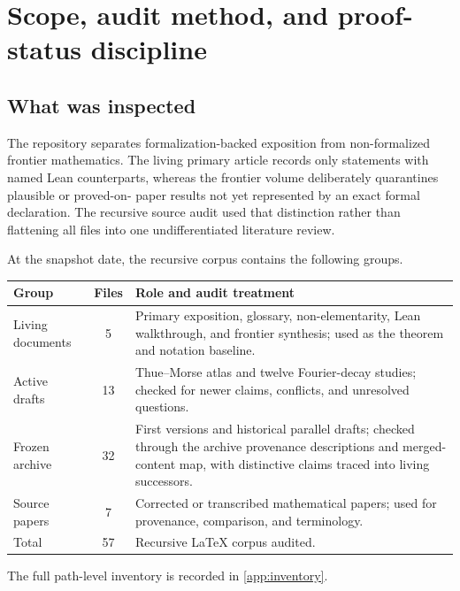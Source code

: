 \documentclass[11pt,oneside]{article}
\theoremstyle{definition}
\theoremstyle{remark}
\begin{document}
\tableofcontents
\newpage

\section{Scope, audit method, and proof-status discipline}

\subsection{What was inspected}
The repository separates formalization-backed exposition from non-formalized frontier
mathematics.  The living primary article records only statements with named Lean
counterparts, whereas the frontier volume deliberately quarantines plausible or proved-on-
paper results not yet represented by an exact formal declaration.  The recursive source
audit used that distinction rather than flattening all files into one undifferentiated
literature review.

At the snapshot date, the recursive corpus contains the following groups.
\begin{center}
\small
\begin{tabularx}{\textwidth}{@{}l c >{\raggedright\arraybackslash}X@{}}
\toprule
Group & Files & Role and audit treatment\\
\midrule
Living documents & 5 & Primary exposition, glossary, non-elementarity, Lean walkthrough,
and frontier synthesis; used as the theorem and notation baseline.\\
Active drafts & 13 & Thue--Morse atlas and twelve Fourier-decay studies; checked for
newer claims, conflicts, and unresolved questions.\\
Frozen archive & 32 & First versions and historical parallel drafts; checked through the
archive provenance descriptions and merged-content map, with distinctive claims traced into
living successors.\\
Source papers & 7 & Corrected or transcribed mathematical papers; used for provenance,
comparison, and terminology.\\
\midrule
Total & 57 & Recursive LaTeX corpus audited.\\
\bottomrule
\end{tabularx}
\end{center}
The full path-level inventory is recorded in \cref{app:inventory}.
\end{document}
